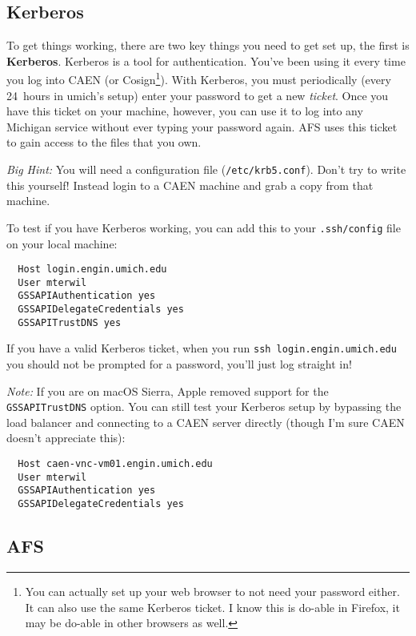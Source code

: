 \documentclass{article}
\begin{document}
\subsection*{Kerberos}

To get things working, there are two key things you need to get set up, the
first is \textbf{Kerberos}. Kerberos is a tool for authentication. You've been
using it every time you log into CAEN (or Cosign\footnote{
  You can actually set up your web browser to not need your password either.
  It can also use the same Kerberos ticket. I know this is do-able in Firefox,
  it may be do-able in other browsers as well.
}). With Kerberos, you must periodically (every 24~hours in umich's setup)
enter your password to get a new \emph{ticket}. Once you have this ticket on
your machine, however, you can use it to log into any Michigan service without
ever typing your password again. AFS uses this ticket to gain access to the
files that you own.

\emph{Big Hint:} You will need a configuration file (\texttt{/etc/krb5.conf}).
Don't try to write this yourself! Instead login to a CAEN machine and grab a
copy from that machine.

To test if you have Kerberos working, you can add this to your
\texttt{.ssh/config} file on your local machine:

\begin{lstlisting}
  Host login.engin.umich.edu
  User mterwil
  GSSAPIAuthentication yes
  GSSAPIDelegateCredentials yes
  GSSAPITrustDNS yes
\end{lstlisting}

If you have a valid Kerberos ticket, when you run
\texttt{ssh~login.engin.umich.edu} you should not be prompted for a password,
you'll just log straight in!

\emph{Note:} If you are on macOS Sierra, Apple removed support for the
\texttt{GSSAPITrustDNS} option. You can still test your Kerberos setup by
bypassing the load balancer and connecting to a CAEN server directly (though I'm
sure CAEN doesn't appreciate this):

\begin{lstlisting}
  Host caen-vnc-vm01.engin.umich.edu
  User mterwil
  GSSAPIAuthentication yes
  GSSAPIDelegateCredentials yes
\end{lstlisting}

\subsection*{AFS}
\end{document}
